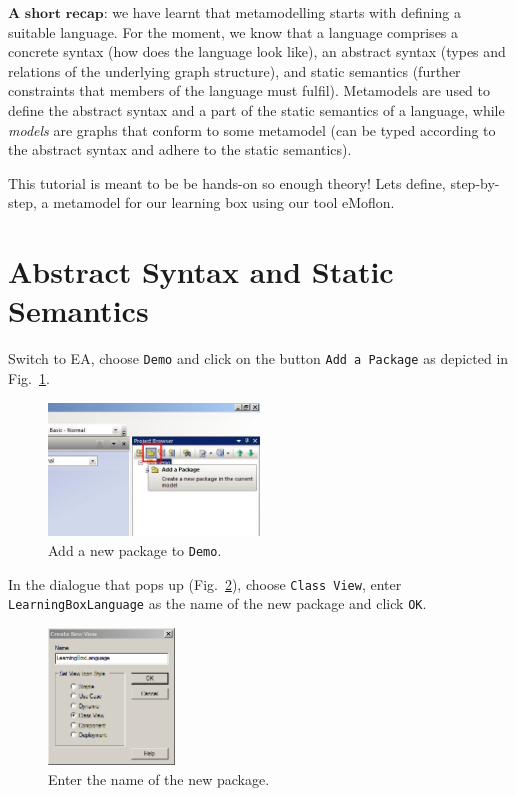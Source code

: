 $\textbf{A short recap:}$  we have learnt that metamodelling starts with defining a suitable language.  
For the moment, we know that a language comprises a concrete syntax (how does the language look like),  an abstract syntax (types and relations of the underlying graph structure), and static semantics (further constraints that members of the language must fulfil).
Metamodels are used to define the abstract syntax and a part of the static semantics of a language, while \emph{models} are graphs that conform to some
metamodel (can be typed  according to the abstract syntax and adhere to the static semantics). 

This tutorial is meant to be be hands-on so enough theory!  
Lets define, step-by-step, a metamodel for our learning box using our tool eMoflon.  
  
\section{Abstract Syntax and Static Semantics}
\label{sec:abstractSyntax}

Switch to EA, choose \texttt{Demo} and click on the button \texttt{Add a
Package} as depicted in Fig.~\ref{fig:new_package}.   

\begin{figure}[htbp]
	\centering
  \includegraphics[width=0.5\textwidth]{pics/memBoxBilder/memBox01.png}
	\caption{Add a new package to \texttt{Demo}.}
	\label{fig:new_package}
\end{figure} 

In the dialogue that pops up (Fig.~\ref{fig:new_package_name}), choose
\texttt{Class View}, enter \texttt{Learning\-Box\-Language} as the name of the new
package and click \texttt{OK}. 

\begin{figure}[htbp]
	\centering
    \includegraphics[width=0.3\textwidth]{pics/memBoxBilder/memBox02.png}
	\caption{Enter the name of the new package.}
	\label{fig:new_package_name}
\end{figure}

